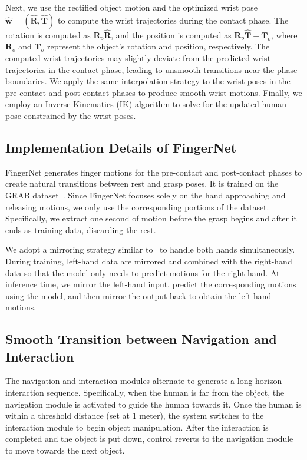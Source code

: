 Next, we use the rectified object motion and the optimized wrist pose $\hat{\bm{w}}=(\bm{\hat{R}}, \bm{\hat{T}})$ to compute the wrist trajectories during the contact phase. 
The rotation is computed as $\bm{R}_o\bm{\hat{R}}$, and the position is computed as $\bm{R}_o \bm{\hat{T}} + \bm{T}_o$, where $\bm{R}_o$ and $\bm{T}_o$ represent the object's rotation and position, respectively.
The computed wrist trajectories may slightly deviate from the predicted wrist trajectories in the contact phase, leading to unsmooth transitions near the phase boundaries. We apply the same interpolation strategy to the wrist poses in the pre-contact and post-contact phases to produce smooth wrist motions. Finally, we employ an Inverse Kinematics (IK) algorithm to solve for the updated human pose constrained by the wrist poses. 


\subsection{Implementation Details of FingerNet}
FingerNet generates finger motions for the pre-contact and post-contact phases to create natural transitions between rest and grasp poses. It is trained on the GRAB dataset~\cite{GRAB:2020}. Since FingerNet focuses solely on the hand approaching and releasing motions, we only use the corresponding portions of the dataset. Specifically, we extract one second of motion before the grasp begins and after it ends as training data, discarding the rest.


We adopt a mirroring strategy similar to~\cite{zhang2021manipnet} to handle both hands simultaneously. During training, left-hand data are mirrored and combined with the right-hand data so that the model only needs to predict motions for the right hand. At inference time, we mirror the left-hand input, predict the corresponding motions using the model, and then mirror the output back to obtain the left-hand motions.

\subsection{Smooth Transition between Navigation and Interaction}
The navigation and interaction modules alternate to generate a long-horizon interaction sequence. Specifically, when the human is far from the object, the navigation module is activated to guide the human towards it. Once the human is within a threshold distance (set at 1 meter), the system switches to the interaction module to begin object manipulation. After the interaction is completed and the object is put down, control reverts to the navigation module to move towards the next object.


